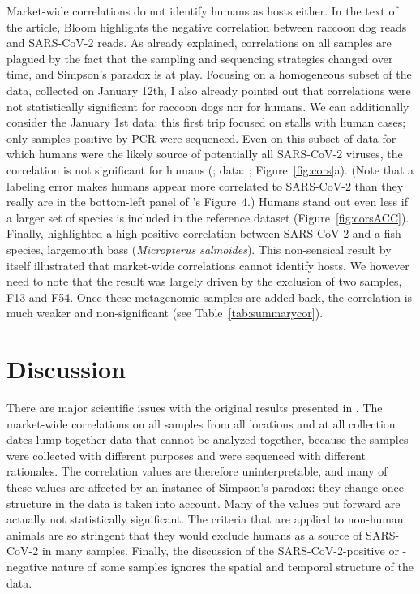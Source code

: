 \documentclass[11pt]{article}
\def \sct {\mbox{SARS-CoV-2}}
\begin{document}
Market-wide correlations do not identify humans as hosts either. In the text of the article, Bloom highlights the negative correlation between raccoon dog reads and \sct{} reads. As already explained, correlations on all samples are plagued by the fact that the sampling and sequencing strategies changed over time, and Simpson's paradox is at play. Focusing on a homogeneous subset of the data, collected on January 12th, I also already pointed out that correlations were not statistically significant for raccoon dogs nor for humans. We can additionally consider the January 1st data: this first trip focused on stalls with human cases; only samples positive by PCR were sequenced. Even on this subset of data for which humans were the likely source of potentially all \sct{} viruses, the correlation is not significant for humans (\JBFirstSCHS{}; data: \citet{Bloom2023VE}; Figure~\ref{fig:cors}a). (Note that a labeling error makes humans appear more correlated to \sct{} than they really are in the bottom-left panel of \citet{Bloom2023VE}'s Figure~4.) Humans stand out even less if a larger set of species is included in the reference dataset (Figure~\ref{fig:corsACC}). Finally, \citet{Bloom2023VE} highlighted a high positive correlation between \sct{} and a fish species, largemouth bass (\textit{Micropterus salmoides}). This non-sensical result by itself illustrated that market-wide correlations cannot identify hosts. We however need to note that the result was largely driven by the exclusion of two samples, F13 and F54. Once these metagenomic samples are added back, the correlation is much weaker and non-significant (see Table~\ref{tab:summarycor}). 

\section{Discussion}
There are major scientific issues with the original results presented in \citet{Bloom2023VE}. The market-wide correlations on all samples from all locations and at all collection dates lump together data that cannot be analyzed together, because the samples were collected with different purposes and were sequenced with different rationales. The correlation values are therefore uninterpretable, and many of these values are affected by an instance of Simpson's paradox: they change once structure in the data is taken into account. Many of the values put forward are actually not statistically significant. The criteria that are applied to non-human animals are so stringent that they would exclude humans as a source of \sct{} in many samples. Finally, the discussion of the \sct{}-positive or -negative nature of some samples ignores the spatial and temporal structure of the data.
  
\end{document}
